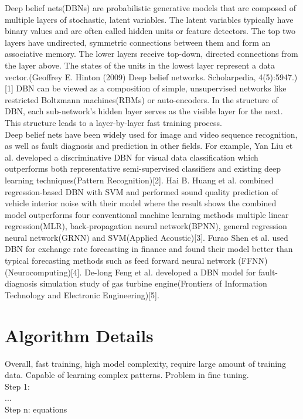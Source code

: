 \documentclass[a4paper,12pt,oneside,onecolumn]{article} %
\begin{document}
Deep belief nets(DBNs) are probabilistic generative models that are composed of multiple layers of stochastic, latent variables. The latent variables typically have binary values and are often called hidden units or feature detectors. The top two layers have undirected, symmetric connections between them and form an associative memory. The lower layers receive top-down, directed connections from the layer above. The states of the units in the lowest layer represent a data vector.(Geoffrey E. Hinton (2009) Deep belief networks. Scholarpedia, 4(5):5947.)[1] DBN can be viewed as a composition of simple, unsupervised networks like restricted Boltzmann machines(RBMs) or auto-encoders. In the structure of DBN, each sub-network's hidden layer serves as the visible layer for the next. This structure leads to a layer-by-layer fast training process.\\
Deep belief nets have been widely used for image and video sequence recognition, as well as fault diagnosis and prediction in other fields. For example, Yan Liu et al. developed a discriminative DBN for visual data classification which outperforms both representative semi-supervised classifiers and existing deep learning techniques(Pattern Recognition)[2]. Hai B. Huang et al. combined regression-based DBN with SVM and performed sound quality prediction of vehicle interior noise with their model where the result shows the combined model outperforms four conventional machine learning methods multiple linear regression(MLR), back-propagation neural network(BPNN), general regression neural network(GRNN) and SVM(Applied Acoustic)[3]. Furao Shen et al. used DBN for exchange rate forecasting in finance and found their model better than typical forecasting methods such as feed forward neural network (FFNN)(Neurocomputing)[4]. De-long Feng et al. developed a DBN model for  fault-diagnosis simulation study of gas turbine engine(Frontiers of Information Technology and Electronic Engineering)[5]. 

\section*{Algorithm Details}
Overall, fast training, high model complexity, require large amount of training data. Capable of learning complex patterns. Problem in fine tuning.\\
Step 1:\\
...\\
Step n:
equations

\end{document}
